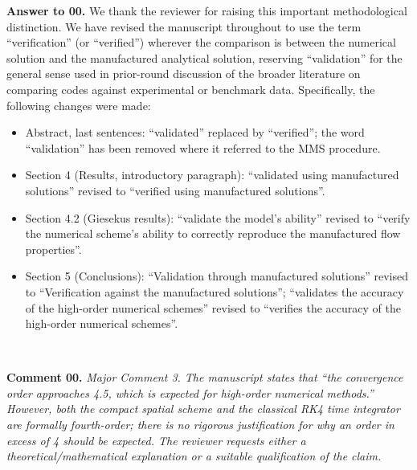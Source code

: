 \documentclass[12pt]{article}
\newcounter{question}
\newcommand{\name}{00}
\newcommand{\question}[1]{\stepcounter{question} \noindent \textbf{Comment \name.\thequestion} \emph{#1} }
\newcommand{\answer}[1]{\noindent \textbf{Answer to \name.\thequestion} #1 \mbox{}\\}
\begin{document}
\answer{We thank the reviewer for raising this important methodological distinction. We have revised the manuscript throughout to use the term ``verification'' (or ``verified'') wherever the comparison is between the numerical solution and the manufactured analytical solution, reserving ``validation'' for the general sense used in prior-round discussion of the broader literature on comparing codes against experimental or benchmark data. Specifically, the following changes were made:
\begin{itemize}
\item Abstract, last sentences: ``validated'' replaced by ``verified''; the word ``validation'' has been removed where it referred to the MMS procedure.
\item Section 4 (Results, introductory paragraph): ``validated using manufactured solutions'' revised to ``verified using manufactured solutions''.
\item Section 4.2 (Giesekus results): ``validate the model's ability'' revised to ``verify the numerical scheme's ability to correctly reproduce the manufactured flow properties''.
\item Section 5 (Conclusions): ``Validation through manufactured solutions'' revised to ``Verification against the manufactured solutions''; ``validates the accuracy of the high-order numerical schemes'' revised to ``verifies the accuracy of the high-order numerical schemes''.
\end{itemize}}

\vspace{3mm}

\question{Major Comment 3. The manuscript states that ``the convergence order approaches 4.5, which is expected for high-order numerical methods.'' However, both the compact spatial scheme and the classical RK4 time integrator are formally fourth-order; there is no rigorous justification for why an order in excess of 4 should be expected. The reviewer requests either a theoretical/mathematical explanation or a suitable qualification of the claim.}
\end{document}
